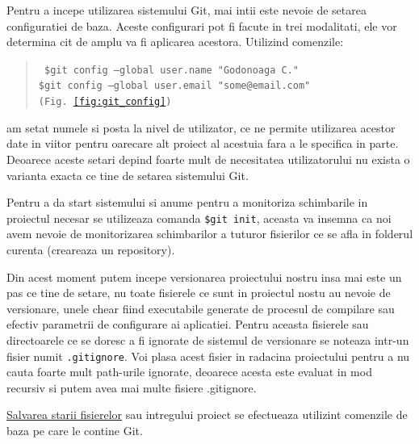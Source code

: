 Pentru a incepe utilizarea sistemului Git, mai intii este nevoie de setarea configuratiei de baza. Aceste configurari pot fi facute in trei modalitati, ele vor determina cit de amplu va fi aplicarea acestora.
Utilizind comenzile:
\begin{quote}\tt
	\$git config --global user.name "Godonoaga C."\\
	\$git config --global user.email "some@email.com" \hfill(Fig.~\ref{fig:git_config})
\end{quote}
am setat numele si posta la nivel de utilizator, ce ne permite utilizarea acestor date in viitor pentru oarecare alt proiect al acestuia fara a le specifica in parte.
Deoarece aceste setari depind foarte mult de necesitatea utilizatorului nu exista o varianta exacta ce tine de setarea sistemului Git.

Pentru a da start sistemului si anume pentru a monitoriza schimbarile in proiectul necesar se utilizeaza comanda {\tt \$git init}, aceasta va insemna ca noi avem nevoie de monitorizarea schimbarilor a tuturor fisierilor ce se afla in folderul curenta (creareaza un repository).

Din acest moment putem incepe versionarea proiectului nostru insa mai este un pas ce tine de setare, nu toate fisierele ce sunt in proiectul nostu au nevoie de versionare, unele chear fiind executabile generate de procesul de compilare sau efectiv parametrii de configurare ai aplicatiei. Pentru aceasta fisierele sau directoarele ce se doresc a fi ignorate de sistemul de versionare se noteaza intr-un fisier numit {\tt.gitignore}. Voi plasa acest fisier in radacina proiectului pentru a nu cauta foarte mult path-urile ignorate, deoarece acesta este evaluat in mod recursiv si putem avea mai multe fisiere .gitignore.

\underline{Salvarea starii fisierelor} sau intregului proiect se efectueaza utilizint comenzile de baza pe care le contine Git.




